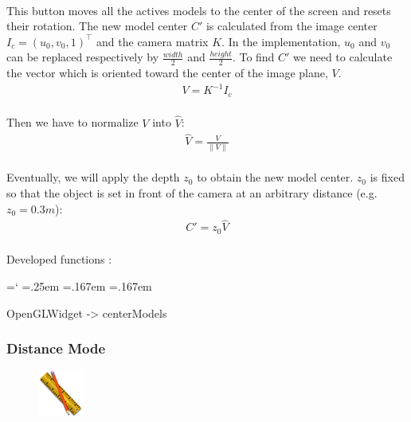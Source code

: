 \documentclass[12pt]{report}
\DeclareRobustCommand*{\ttfamily}{
  \origttfamily
  \hyphenchar\font=`\-\relax
  \fontdimen3\font=.25em\relax
  \fontdimen4\font=.167em\relax
  \fontdimen7\font=.167em\relax
}
\newenvironment{code}{\ttfamily}{}
\newcommand{\norm}[1]{\lVert#1\rVert}
\begin{document}
\paragraph{}
	This button moves all the actives models to the center of the screen and resets their rotation. The new model center $C'$ is calculated from the image center $I_c=(u_0,v_0,1)^\top$ and the camera matrix $K$. In the implementation, $u_0$ and $v_0$ can be replaced respectively by $\frac{width}{2}$ and $\frac{height}{2}$. To find $C'$ we need to calculate the vector which is oriented toward the center of the image plane, $V$.
\begin{align}
V = K^{-1} I_c
\end{align}

\paragraph{}
Then we have to normalize $V$ into $\hat{V}$:
\begin{align}
\hat{V} = \frac{V}{\norm{V}}
\end{align}

\paragraph{}
Eventually, we will apply the depth $z_0$ to obtain the new model center. $z_0$ is fixed so that the object is set in front of the camera at an arbitrary distance (e.g. $z_0=0.3 m$):
\begin{align}
C' = z_0 \hat{V}
\end{align}


\paragraph{}
	Developed functions :

	\begin{code}
	OpenGLWidget -> centerModels
	\end{code}


\vspace{10pt}
\subsubsection{Distance Mode} \label{subsubsec:distance mode}
\begin{figure}
\vspace{-20pt}
\includegraphics[width=1.5cm]{icons/distance.png}
\end{figure}
\end{document}
